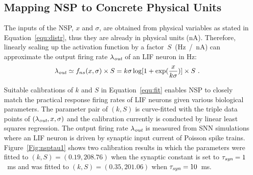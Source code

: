 	\subsection{Mapping NSP to Concrete Physical Units}
	\label{sec:af_model}
	The inputs of the NSP, $x$ and $\sigma$, are obtained from physical variables as stated in Equation~\ref{equ:distr}, thus they are already in physical units (nA).
	Therefore, linearly scaling up the activation function by a factor~$S$~(Hz~/~nA) can approximate the output firing rate $\lambda_{\textit{\textrm{out}}}$ of an LIF neuron in Hz:
	\begin{equation}
	\lambda_{\textit{\textrm{out}}} \simeq f_{ns}(x, \sigma) \times S = k \sigma \log [1 + \exp(\frac{x}{k \sigma})] \times S~.
	\label{equ:fit}
	\end{equation}	
	
	
	Suitable calibrations of $k$ and $S$ in Equation~\ref{equ:fit} enables NSP to closely match the practical response firing rates of LIF neurons given various biological parameters.
	The parameter pair of $(k, S)$ is curve-fitted with the triple data points of $(\lambda_{\textit{\textrm{out}}}, x, \sigma)$ and the calibration currently is conducted by linear least squares regression.
	The output firing rate $\lambda_{\textit{\textrm{out}}}$ is measured from SNN simulations where an LIF neuron is driven by synaptic input current of Poisson spike trains.
	Figure~\ref{Fig:nsptau1} shows two calibration results in which the parameters were fitted to $(k, S)=(0.19,208.76)$ when the synaptic constant is set to $\tau_{\textit{\textrm{syn}}}=1$~ms and was fitted to $(k, S)=(0.35,201.06)$ when $\tau_{\textit{\textrm{syn}}}=10$~ms.
	
